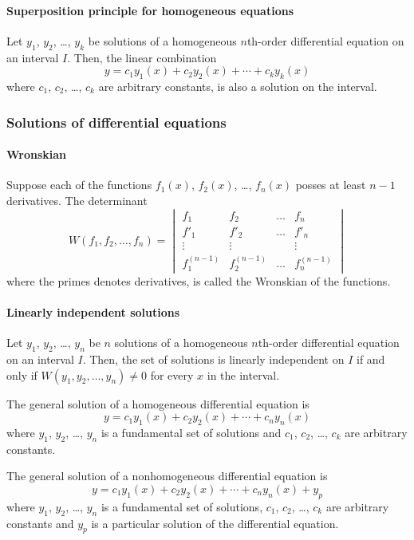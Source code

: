 \documentclass[10pt, twocolumn]{article}
\theoremstyle{definition}
\begin{document}
\paragraph*{Superposition principle for homogeneous equations}
Let \(y_1 \), \(y_2 \), \dots, \(y_k \) be solutions of a homogeneous \(n\)th-order differential equation on an interval \(I\).
Then, the linear combination
\[
  y = c_1 y_1 (x) + c_2 y_2 (x) + \cdots + c_k y_k (x)
\]
where \(c_1 \), \(c_2 \), \dots, \(c_k \) are arbitrary constants, is also a solution on the interval.


\subsubsection*{Solutions of differential equations}
\paragraph*{Wronskian}
Suppose each of the functions \(f_1 (x)\), \(f_2 (x)\), \dots, \(f_n (x)\) posses at least \(n - 1\) derivatives.
The determinant
\[
  W(f_1 , f_2 , \dots, f_n ) =
  \begin{vmatrix}
    f_1           & f_2           & \dots & f_n           \\
    f'_1          & f'_2          & \dots & f'_n          \\
    \vdots        & \vdots        &       & \vdots        \\
    f^{(n - 1)}_1 & f^{(n - 1)}_2 & \dots & f^{(n - 1)}_n
  \end{vmatrix}
\]
where the primes denotes derivatives, is called the Wronskian of the functions.

\paragraph*{Linearly independent solutions}
Let \(y_1 \), \(y_2 \), \dots, \(y_n \) be \(n\) solutions of a homogeneous \(n\)th-order differential equation on an interval \(I\).
Then, the set of solutions is linearly independent on \(I\) if and only if \(W(y_1 , y_2 , \dots, y_n ) \neq 0\) for every \(x\) in the interval.

The general solution of a homogeneous differential equation is
\[
  y = c_1 y_1 (x) + c_2 y_2 (x) + \cdots + c_n y_n (x)
\]
where \(y_1 \), \(y_2 \), \dots, \(y_n \) is a fundamental set of solutions and \(c_1 \), \(c_2 \), \dots, \(c_k \) are arbitrary constants.

The general solution of a nonhomogeneous differential equation is
\[
  y = c_1 y_1 (x) + c_2 y_2 (x) + \cdots + c_n y_n (x) + y_p
\]
where \(y_1 \), \(y_2 \), \dots, \(y_n \) is a fundamental set of solutions, \(c_1 \), \(c_2 \), \dots, \(c_k \) are arbitrary constants and \(y_p \) is a particular solution of the differential equation.
\end{document}
